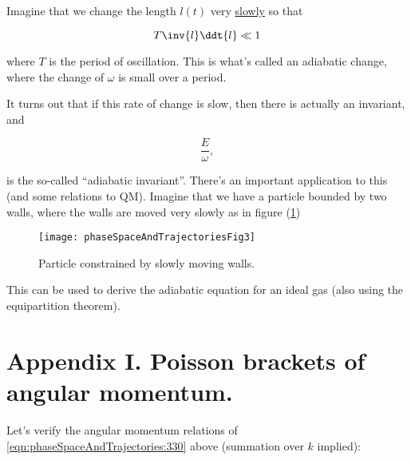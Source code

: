 Imagine that we change the length $l(t)$ very \underline{slowly} so that

\begin{equation}\label{eqn:phaseSpaceAndTrajectories:370}
T \inv{l} \ddt{l} \ll 1
\end{equation}

where $T$ is the period of oscillation.  This is what's called an adiabatic change, where the change of $\omega$ is small over a period.

It turns out that if this rate of change is slow, then there is actually an invariant, and

\begin{equation}\label{eqn:phaseSpaceAndTrajectories:390}
\frac{E}{\omega},
\end{equation}

is the so-called ``adiabatic invariant''.  There's an important application to this (and some relations to QM).  Imagine that we have a particle bounded by two walls, where the walls are moved very slowly as in figure (\ref{fig:phaseSpaceAndTrajectories:phaseSpaceAndTrajectoriesFig3})
\begin{figure}[htp]
   \centering
   \texttt{[image: phaseSpaceAndTrajectoriesFig3]}
   \caption{Particle constrained by slowly moving walls.}\label{fig:phaseSpaceAndTrajectories:phaseSpaceAndTrajectoriesFig3}
\end{figure}

This can be used to derive the adiabatic equation for an ideal gas (also using the equipartition theorem).

\section{Appendix I.  Poisson brackets of angular momentum.}

Let's verify the angular momentum relations of \ref{eqn:phaseSpaceAndTrajectories:330} above (summation over $k$ implied):

